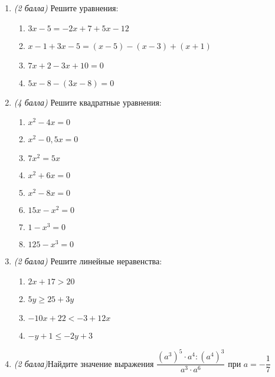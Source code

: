 \documentclass[12pt, a4paper]{article}
\begin{document}
	
	
	\begin{enumerate}
		\item \textit{(2 балла)} Решите уравнения:
		\begin{multicols}{2}
		\begin{enumerate}[label=\asbuk*)]
			\item $3x-5=-2x+7+5x-12$
			\item $x-1+3x-5=(x-5)-(x-3)+(x+1)$
			\item $7x+2-3x+10=0$
			\item $5x-8-(3x-8)=0$
		\end{enumerate}
		\end{multicols}
		\item \textit{(4 балла)} Решите квадратные уравнения:
		\begin{multicols}{2}
			\begin{enumerate}[label=\asbuk*)]
				\item $x^2-4x=0$
				\item $x^2-0,5x=0$
				\item $7x^2=5x$
				\item $x^2+6x=0$
				\item $x^2-8x=0$
				\item $15x-x^2=0$
				\item $1-x^3=0$
				\item $125-x^3=0$
			\end{enumerate}
		\end{multicols}
		\item \textit{(2 балла)} Решите линейные неравенства:
		\begin{multicols}{2}
			\begin{enumerate}[label=\asbuk*)]
				\item $2x+17>20$
				\item $5y\geqslant25+3y$
				\item $-10x+22<-3+12x$
				\item $-y+1\leqslant-2y+3$
			\end{enumerate}
		\end{multicols}
	\item \textit{(2 балла)}Найдите значение выражения $\dfrac{(a^3)^5\cdot a^4 : (a^4)^3}{a^3\cdot a^6}$ при $a=-\dfrac{1}{7}$
	\end{enumerate}
	
\end{document}
